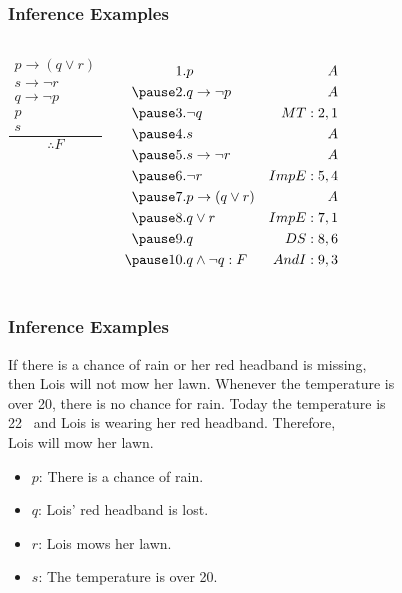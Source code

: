 \documentclass[dvipsnames]{beamer}
\begin{document}
\begin{frame}
  \frametitle{Inference Examples}

  \begin{columns}
    \[
    \frac
      {
        \begin{array}{c}
          p \rightarrow (q \vee r)\\
          s \rightarrow \neg r\\
          q \rightarrow \neg p\\
          p\\
          s
        \end{array}
      }
      {
        \therefore F
      }
    \]

    \pause
    \begin{eqnarray*}
      1. & p                        & A\\
      \pause
      2. & q \rightarrow \neg p     & A\\
      \pause
      3. & \neg q                   & MT:2,1\\
      \pause
      4. & s                        & A\\
      \pause
      5. & s \rightarrow \neg r     & A\\
      \pause
      6. & \neg r                   & ImpE:5,4\\
      \pause
      7. & p \rightarrow (q \vee r) & A\\
      \pause
      8. & q \vee r                 & ImpE:7,1\\
      \pause
      9. & q                        & DS:8,6\\
      \pause
      10. & q \wedge \neg q : F     & AndI:9,3
    \end{eqnarray*}
  \end{columns}
\end{frame}

\begin{frame}
  \frametitle{Inference Examples}

  If there is a chance of rain or her red headband is missing,\\
  then Lois will not mow her lawn. Whenever the temperature is\\
  over 20\textcelsius, there is no chance for rain. Today the temperature is\\
  22\textcelsius ~ and Lois is wearing her red headband. Therefore,\\
  Lois will mow her lawn.

  \pause
  \medskip
  \begin{itemize}
    \item $p$: There is a chance of rain.
    \item $q$: Lois' red headband is lost.
    \item $r$: Lois mows her lawn.
    \item $s$: The temperature is over 20\textcelsius.
  \end{itemize}
\end{frame}
\end{document}
